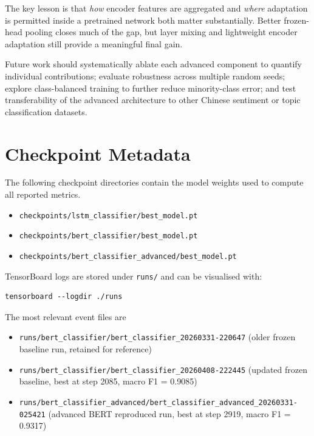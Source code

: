 \documentclass{article}
\begin{document}
The key lesson is that \emph{how} encoder features are aggregated and
\emph{where} adaptation is permitted inside a pretrained network both matter
substantially.  Better frozen-head pooling closes much of the gap, but
layer mixing and lightweight encoder adaptation still provide a meaningful final
gain.

Future work should systematically ablate each advanced component to quantify
individual contributions; evaluate robustness across multiple random seeds;
explore class-balanced training to further reduce minority-class error; and test
transferability of the advanced architecture to other Chinese sentiment or topic
classification datasets.

\nocite{hochreiter1997long, devlin2019bert, cui2020revisiting, hu2022lora,
        zaken2022bitfit, loshchilov2018decoupled, tenney2019bert}



\appendix
\section{Checkpoint Metadata}

The following checkpoint directories contain the model weights used to compute
all reported metrics.

\begin{itemize}
  \item \texttt{checkpoints/lstm\_classifier/best\_model.pt}
  \item \texttt{checkpoints/bert\_classifier/best\_model.pt}
  \item \texttt{checkpoints/bert\_classifier\_advanced/best\_model.pt}
\end{itemize}

TensorBoard logs are stored under \texttt{runs/} and can be visualised with:
\begin{verbatim}
tensorboard --logdir ./runs
\end{verbatim}

The most relevant event files are
\begin{itemize}
  \item \texttt{runs/bert\_classifier/bert\_classifier\_20260331-220647}
    (older frozen baseline run, retained for reference)
  \item \texttt{runs/bert\_classifier/bert\_classifier\_20260408-222445}
    (updated frozen baseline, best at step 2085, macro F1 = 0.9085)
  \item \texttt{runs/bert\_classifier\_advanced/bert\_classifier\_advanced\_20260331-025421}
    (advanced BERT reproduced run, best at step 2919, macro F1 = 0.9317)
\end{itemize}
\end{document}
